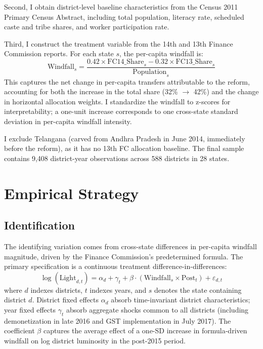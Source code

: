 \documentclass[12pt]{article}
\begin{document}
Second, I obtain district-level baseline characteristics from the Census 2011 Primary Census Abstract, including total population, literacy rate, scheduled caste and tribe shares, and worker participation rate.

Third, I construct the treatment variable from the 14th and 13th Finance Commission reports. For each state $s$, the per-capita windfall is:
\begin{equation}
\text{Windfall}_s = \frac{0.42 \times \text{FC14\_Share}_s - 0.32 \times \text{FC13\_Share}_s}{\text{Population}_s}
\end{equation}
This captures the net change in per-capita transfers attributable to the reform, accounting for both the increase in the total share (32\% $\to$ 42\%) and the change in horizontal allocation weights. I standardize the windfall to z-scores for interpretability; a one-unit increase corresponds to one cross-state standard deviation in per-capita windfall intensity.

I exclude Telangana (carved from Andhra Pradesh in June 2014, immediately before the reform), as it has no 13th FC allocation baseline. The final sample contains 9,408 district-year observations across 588 districts in 28 states.




\section{Empirical Strategy}

\subsection{Identification}

The identifying variation comes from cross-state differences in per-capita windfall magnitude, driven by the Finance Commission's predetermined formula. The primary specification is a continuous treatment difference-in-differences:
\begin{equation}
\log(\text{Light}_{d,t}) = \alpha_d + \gamma_t + \beta \cdot (\text{Windfall}_s \times \text{Post}_t) + \varepsilon_{d,t}
\label{eq:main}
\end{equation}
where $d$ indexes districts, $t$ indexes years, and $s$ denotes the state containing district $d$. District fixed effects $\alpha_d$ absorb time-invariant district characteristics; year fixed effects $\gamma_t$ absorb aggregate shocks common to all districts (including demonetization in late 2016 and GST implementation in July 2017). The coefficient $\beta$ captures the average effect of a one-SD increase in formula-driven windfall on log district luminosity in the post-2015 period.
\end{document}
